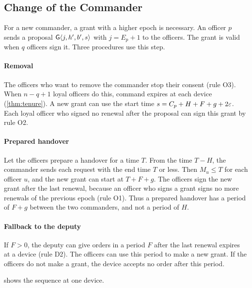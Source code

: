 \subsection{Change of the Commander}
\label{sec:change}

For a new commander, a grant with a higher epoch is necessary. An officer $p$ sends a proposal
$\mathsf{G}\langle j,h',b',s\rangle$ with $j = E_p + 1$ to the officers. The grant is valid when $q$
officers sign it. Three procedures use this step.

\paragraph{Removal}
The officers who want to remove the commander stop their consent (rule O3). When
$n - q + 1$ loyal officers do this, command expires at each device (\cref{thm:tenure}). A
new grant can use the start time $s = C_p + H + F + g + 2\varepsilon$. Each loyal officer who
signed no renewal after the proposal can sign this grant by rule O2.

\paragraph{Prepared handover}
Let the officers prepare a handover for a time $T$. From the time $T - H$, the commander sends
each request with the end time $T$ or less. Then $M_u \le T$ for each officer $u$, and the
new grant can start at $T + F + g$. The officers sign the new grant after the last renewal,
because an officer who signs a grant signs no more renewals of the previous epoch (rule O1).
Thus a prepared handover has a period of $F + g$ between the two commanders, and not a
period of $H$.

\paragraph{Fallback to the deputy}
If $F > 0$, the deputy can give orders in a period $F$ after the last renewal expires at a
device (rule D2). The officers can use this period to make a new grant. If the officers do
not make a grant, the device accepts no order after this period.

 shows the sequence at one device.

